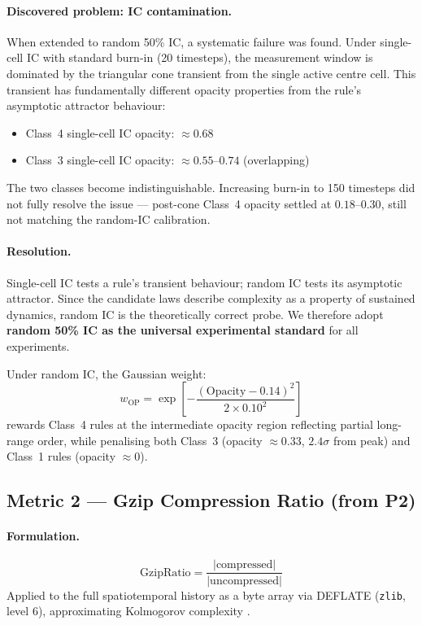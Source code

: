 \documentclass[12pt,a4paper]{article}
\begin{document}
\paragraph{Discovered problem: IC contamination.}
When extended to random 50\% IC, a systematic failure was found.
Under single-cell IC with standard burn-in (20 timesteps), the measurement
window is dominated by the triangular cone transient from the single active
centre cell.
This transient has fundamentally different opacity properties from the
rule's asymptotic attractor behaviour:
\begin{itemize}[noitemsep]
  \item Class~4 single-cell IC opacity: $\approx 0.68$
  \item Class~3 single-cell IC opacity: $\approx 0.55$--$0.74$ (overlapping)
\end{itemize}
The two classes become indistinguishable.
Increasing burn-in to 150 timesteps did not fully resolve the issue ---
post-cone Class~4 opacity settled at $0.18$--$0.30$, still not matching
the random-IC calibration.

\paragraph{Resolution.}
Single-cell IC tests a rule's transient behaviour; random IC tests its
asymptotic attractor.
Since the candidate laws describe complexity as a property of sustained
dynamics, random IC is the theoretically correct probe.
We therefore adopt \textbf{random 50\% IC as the universal experimental
standard} for all experiments.

Under random IC, the Gaussian weight:
\begin{equation}
w_\text{OP} = \exp\!\left[-\frac{(\text{Opacity} - 0.14)^2}{2 \times 0.10^2}\right]
\end{equation}
rewards Class~4 rules at the intermediate opacity region reflecting partial
long-range order, while penalising both Class~3 (opacity $\approx 0.33$,
$2.4\sigma$ from peak) and Class~1 rules (opacity $\approx 0$).

\subsection{Metric 2 --- Gzip Compression Ratio (from P2)}

\paragraph{Formulation.}
\begin{equation}
\text{GzipRatio} = \frac{|\text{compressed}|}{|\text{uncompressed}|}
\end{equation}
Applied to the full spatiotemporal history as a byte array via DEFLATE
(\texttt{zlib}, level 6), approximating Kolmogorov complexity
\citep{kolmogorov1965}.
\end{document}
